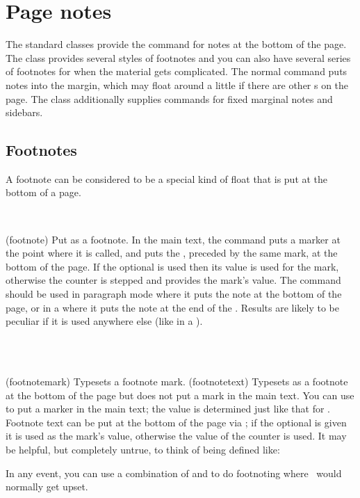 \chapter{Page notes} \label{chap:mnotes}

   The standard classes provide the \cmd{\footnote} command for notes
at the bottom of the page. The class provides several styles of footnotes
and you can also have several series of footnotes for when the material
gets complicated. The normal \cmd{\marginpar} command puts notes into
the margin, which may float around a little if there are other
\cmd{\marginpar}s on the page. The class additionally supplies commands
for fixed marginal notes and sidebars.


\section{Footnotes}

    A footnote can be considered to be a special kind of float 
that is put at the bottom of a page.

\begin{syntax}
\cmd{\footnote} \\
\end{syntax}
\glossary(footnote)
  {}%
  {Put  as a footnote.}
In the main text, the \cmd{\footnote} command puts a marker at the
point where it is called, and puts the , preceded by the same
mark, at the bottom of the page. If the optional  is used
then its value is used for the mark, otherwise the 
counter is stepped and provides the mark's value. The \cmd{\footnote}
command should be used in paragraph mode where it puts the note at the
bottom of the page, or in a  where it puts the note
at the end of the . Results are likely to be peculiar if
it is used anywhere else (like in a ).

\begin{syntax}
\cmd{\footnotemark} \\
\cmd{\footnotetext} \\
\end{syntax}
\glossary(footnotemark)%
  {}%
  {Typesets a footnote mark.}
\glossary(footnotetext)%
  {}%
  {Typesets  as a footnote at the bottom of the page but does 
   not put a mark in the main text.}
    You can use \cmd{\footnotemark} to put a marker in the main text; the value
is determined just like that for \cmd{\footnote}. Footnote text can be put 
at the bottom of the page via \cmd{\footnotetext}; if the optional 
is given it is used as the mark's value, otherwise the value of the
 counter is used.
   It may be helpful, but completely untrue, to think of \cmd{\footnote} being
defined like:
\begin{lcode}
\newcommand{\footnote}[1]{\footnotemark\footnotetext{#1}}
\end{lcode}
In any event, you can use a combination of \cmd{\footnotemark} and 
\cmd{\footnotetext} to do footnoting where \ltx\ would normally get upset.


